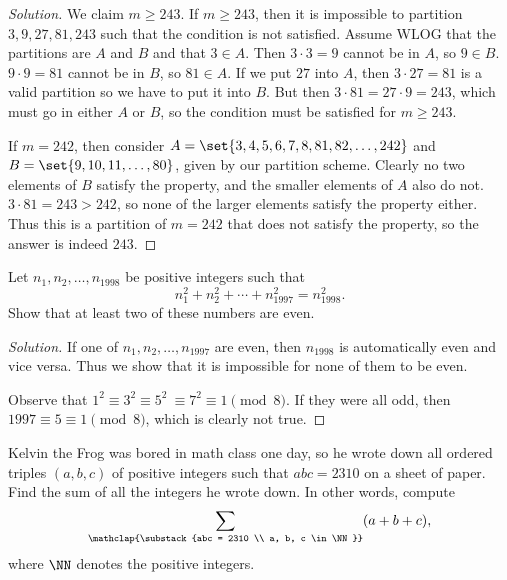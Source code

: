 \ifsolutions
\begin{proof}[Solution]
We claim $m \geq 243$. If $m \geq 243$, then it is impossible to partition $3,
9, 27, 81, 243$ such that the condition is not satisfied. Assume WLOG that the
partitions are $A$ and $B$ and that $3 \in A$. Then $3 \cdot 3 = 9$ cannot be in
$A$, so $9 \in B$. $9 \cdot 9 = 81$ cannot be in $B$, so $81 \in A$. If we put
$27$ into $A$, then $3 \cdot 27 = 81$ is a valid partition so we have to put it
into $B$. But then $3 \cdot 81 = 27 \cdot 9 = 243$, which must go in either $A$
or $B$, so the condition must be satisfied for $m \geq 243$.

If $m = 242$, then consider $A = \set{3, 4, 5, 6, 7, 8, 81, 82, \dots, 242}$ and
$B = \set{9, 10, 11, \dots, 80}$, given by our partition scheme. Clearly no two
elements of $B$ satisfy the property, and the smaller elements of $A$ also do
not. $3 \cdot 81 = 243 > 242$, so none of the larger elements satisfy the
property either. Thus this is a partition of $m = 242$ that does not satisfy the
property, so the answer is indeed $\boxed{243}$.
\end{proof}
\fi

\begin{prb}[1997 JBMO-5]
Let $n_1, n_2, \dots, n_{1998}$ be positive integers such that
\[ n_1^2 + n_2^2 + \cdots + n_{1997}^2 = n_{1998}^2. \]
Show that at least two of these numbers are even.
\end{prb}

\ifsolutions
\begin{proof}[Solution]
If one of $n_1, n_2, \dots, n_{1997}$ are even, then $n_{1998}$ is automatically
even and vice versa. Thus we show that it is impossible for none of them to be
even.

Observe that $1^2 \equiv 3^2 \equiv 5^2 \ \equiv 7^2 \equiv 1 \pmod{8}$. If they
were all odd, then $1997 \equiv 5 \equiv 1 \pmod{8}$, which is clearly not true.
\end{proof}
\fi

\begin{prb}[HMMT 2017 A-5]
Kelvin the Frog was bored in math class one day, so he wrote down all ordered
triples $(a, b, c)$ of positive integers such that $abc = 2310$ on a sheet of
paper. Find the sum of all the integers he wrote down. In other words, compute
\[ \sum_{\mathclap{\substack{abc = 2310 \\ a, b, c \in \NN}}} (a + b + c), \]
where $\NN$ denotes the positive integers.
\end{prb}

